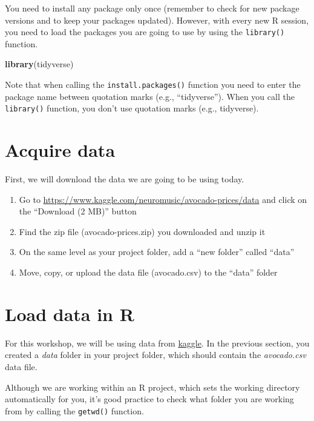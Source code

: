 \documentclass[]{book}
\newenvironment{Shaded}{\begin{snugshade}}{\end{snugshade}}
\newcommand{\KeywordTok}[1]{\textcolor[rgb]{0.13,0.29,0.53}{\textbf{#1}}}
\newcommand{\NormalTok}[1]{#1}
\providecommand{\tightlist}{%
  \setlength{\itemsep}{0pt}\setlength{\parskip}{0pt}}
\begin{document}
You need to install any package only once (remember to check for new package versions and to keep your packages updated). However, with every new R session, you need to load the packages you are going to use by using the \texttt{library()} function.

\begin{Shaded}
\begin{Highlighting}[]
\KeywordTok{library}\NormalTok{(tidyverse)}
\end{Highlighting}
\end{Shaded}

\leavevmode\hypertarget{explanation}{}%
Note that when calling the \texttt{install.packages()} function you need to enter the package name between quotation marks (e.g., ``tidyverse''). When you call the \texttt{library()} function, you don't use quotation marks (e.g., tidyverse).

\hypertarget{acquire-data}{%
\section{Acquire data}\label{acquire-data}}

First, we will download the data we are going to be using today.

\begin{enumerate}
\def\labelenumi{\arabic{enumi}.}
\tightlist
\item
  Go to \url{https://www.kaggle.com/neuromusic/avocado-prices/data} and click on the ``Download (2 MB)'' button
\item
  Find the zip file (avocado-prices.zip) you downloaded and unzip it
\item
  On the same level as your project folder, add a ``new folder'' called ``data''
\item
  Move, copy, or upload the data file (avocado.csv) to the ``data'' folder
\end{enumerate}

\hypertarget{load-data-in-r}{%
\section{Load data in R}\label{load-data-in-r}}

For this workshop, we will be using data from \href{https://www.kaggle.com/}{kaggle}. In the previous section, you created a \emph{data} folder in your project folder, which should contain the \emph{avocado.csv} data file.

Although we are working within an R project, which sets the working directory automatically for you, it's good practice to check what folder you are working from by calling the \texttt{getwd()} function.
\end{document}
